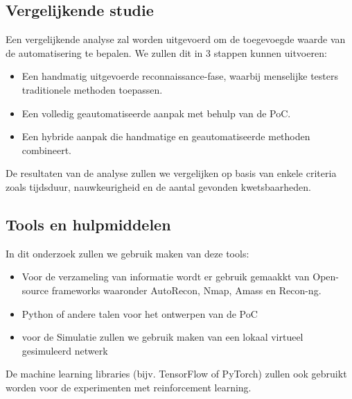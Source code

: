 



\subsection{Vergelijkende studie}

Een vergelijkende analyse zal worden uitgevoerd om de toegevoegde waarde van de automatisering te bepalen. We zullen dit in 3 stappen kunnen uitvoeren:

\begin{itemize}
    \item Een handmatig uitgevoerde reconnaissance-fase, waarbij menselijke testers traditionele methoden toepassen.
    \item Een volledig geautomatiseerde aanpak met behulp van de PoC.
    \item Een hybride aanpak die handmatige en geautomatiseerde methoden combineert.
\end{itemize}

De resultaten van de analyse zullen we vergelijken op basis van enkele criteria zoals tijdsduur, nauwkeurigheid en de aantal gevonden kwetsbaarheden.

\subsection{Tools en hulpmiddelen}

In dit onderzoek zullen we gebruik maken van deze tools: 

\begin{itemize}
    \item Voor de verzameling van informatie wordt er gebruik gemaakkt van Open-source frameworks waaronder AutoRecon, Nmap, Amass en Recon-ng.
    \item Python of andere talen voor het ontwerpen van de PoC
    \item voor de Simulatie zullen we gebruik maken van een lokaal virtueel gesimuleerd netwerk
\end{itemize}

De machine learning libraries (bijv. TensorFlow of PyTorch) zullen ook gebruikt worden voor de experimenten met reinforcement learning.

